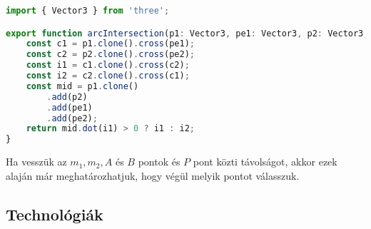 \begin{lstlisting}[language={JavaScript}]
import { Vector3 } from 'three';

export function arcIntersection(p1: Vector3, pe1: Vector3, p2: Vector3, pe2: Vector3): Vector3 {
	const c1 = p1.clone().cross(pe1);
	const c2 = p2.clone().cross(pe2);
	const i1 = c1.clone().cross(c2);
	const i2 = c2.clone().cross(c1);
	const mid = p1.clone()
		.add(p2)
		.add(pe1)
		.add(pe2);
	return mid.dot(i1) > 0 ? i1 : i2;
}
\end{lstlisting}

Ha vesszük az $m_1, m_2, A$ és $B$ pontok és $P$ pont közti távolságot, akkor ezek alaján már meghatározhatjuk, hogy végül melyik pontot válasszuk.



















































\subsection{Technológiák}


